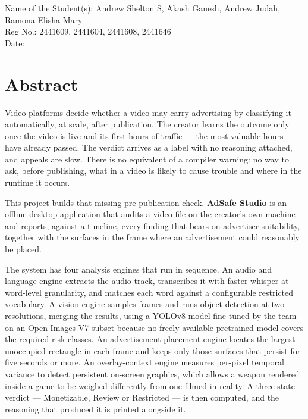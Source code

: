 \documentclass[
12pt,
a4paper,
oneside
]{report}
\begin{document}
\vspace{0.5cm}
\noindent
Name of the Student(s): Andrew Shelton S, Akash Ganesh, Andrew Judah,
Ramona Elisha Mary \\
Reg No.: 2441609, 2441604, 2441608, 2441646 \\
Date:


\chapter*{Abstract}

Video platforms decide whether a video may carry advertising by classifying it
automatically, at scale, after publication. The creator learns the outcome only
once the video is live and its first hours of traffic --- the most valuable
hours --- have already passed. The verdict arrives as a label with no reasoning
attached, and appeals are slow. There is no equivalent of a compiler warning: no
way to ask, before publishing, what in a video is likely to cause trouble and
where in the runtime it occurs.

This project builds that missing pre-publication check. \textbf{AdSafe Studio} is
an offline desktop application that audits a video file on the creator's own
machine and reports, against a timeline, every finding that bears on
advertiser suitability, together with the surfaces in the frame where an
advertisement could reasonably be placed.

The system has four analysis engines that run in sequence. An audio and language
engine extracts the audio track, transcribes it with faster-whisper at
word-level granularity, and matches each word against a configurable restricted
vocabulary. A vision engine samples frames and runs object detection at two
resolutions, merging the results, using a YOLOv8 model fine-tuned by the team on
an Open Images V7 subset because no freely available pretrained model covers the
required risk classes. An advertisement-placement engine locates the largest
unoccupied rectangle in each frame and keeps only those surfaces that persist
for five seconds or more. An overlay-context engine measures per-pixel temporal
variance to detect persistent on-screen graphics, which allows a weapon rendered
inside a game to be weighed differently from one filmed in reality. A
three-state verdict --- Monetizable, Review or Restricted --- is then computed,
and the reasoning that produced it is printed alongside it.
\end{document}

